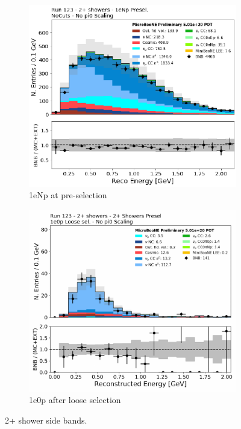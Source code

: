 \begin{figure}[H] 
\begin{center}
    \begin{subfigure}[b]{0.45\textwidth}
    \centering
    \includegraphics[width=1.00\textwidth]{Fakedata/set1/np_2shr.pdf}
    \caption{\label{fig:fakedata:set1:2shrnp} 1eNp at pre-selection}
    \end{subfigure}
    \begin{subfigure}[b]{0.45\textwidth}
    \centering
    \includegraphics[width=1.00\textwidth]{Fakedata/set1/zp_2shr.pdf}
    \caption{\label{fig:fakedata:set1:2shr0p} 1e0p after loose selection}
    \end{subfigure}
\caption{\label{fig:fakedata:set1:2shr} 2+ shower side bands.}
\end{center}
\end{figure}

